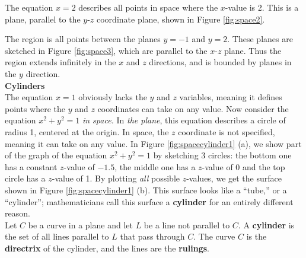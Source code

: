 The equation $x=2$ describes all points in space where the $x$-value is 2. This is a plane, parallel to the $y$-$z$ coordinate plane, shown in Figure \ref{fig:space2}.\\


{The region is all points between the planes $y=-1$ and $y=2$. These planes are sketched in Figure \ref{fig:space3}, which are parallel to the $x$-$z$ plane. Thus the region extends infinitely in the $x$ and $z$ directions, and is bounded by planes in the $y$ direction.
}\\



\noindent\textbf{\large Cylinders}\\

The equation $x=1$ obviously lacks the $y$ and $z$ variables, meaning it defines points where the $y$ and $z$ coordinates can take on any value. Now consider the equation $x^2+y^2=1$ \emph{in space.} In \emph{the plane}, this equation describes a circle of radius 1, centered at the origin. In space, the $z$ coordinate is not specified, meaning it can take on any value. In Figure \ref{fig:spacecylinder1} (a), we show part of the graph of the equation $x^2+y^2=1$ by sketching 3 circles: the bottom one has a constant $z$-value of $-1.5$, the middle one has a $z$-value of 0 and the top circle has a $z$-value of 1. By plotting \emph{all} possible $z$-values, we get the  surface shown in Figure \ref{fig:spacecylinder1} (b). 
This surface looks like a ``tube,'' or a ``cylinder''; mathematicians call this surface a \textbf{cylinder} for an entirely different reason.\\

{Let $C$ be a curve in a plane and let $L$ be a line not parallel to $C$. A \textbf{cylinder} is the set of all lines parallel to $L$ that pass through $C$. The curve $C$ is the \textbf{directrix} of the cylinder, and the lines are the \textbf{rulings}.
}

